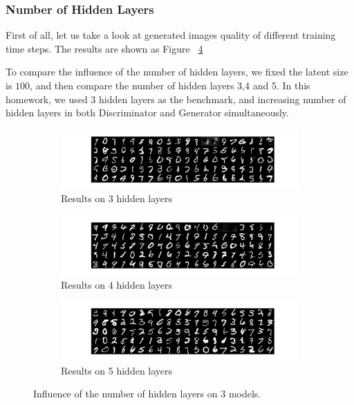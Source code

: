 \documentclass[12pt,letterpaper]{article}
\begin{document}
\subsubsection{Number of Hidden Layers}

First of all, let us take a look at generated images quality of different training time steps. The results are shown as Figure ~\ref{fig:MNIST_GAN_hidden}

To compare the influence of the number of hidden layers, we fixed the latent size is $100$, and then compare the number of hidden layers 3,4 and 5. In this homework, we used 3 hidden layers as the benchmark, and increasing number of hidden layers in both Discriminator and Generator simultaneously. 

\begin{figure}[h]
    \begin{subfigure}{0.49\textwidth}
    \includegraphics[width=\linewidth]{GAN_MNIST_0_100_256.png}
    \caption{\small Results on 3 hidden layers} \label{fig:a}
    \end{subfigure}\hspace*{\fill}
    \begin{subfigure}{0.49\textwidth}
    \includegraphics[width=\linewidth]{GAN_MNIST_1_100_256.png}
    \caption{\small Results on 4 hidden layers} \label{fig:b}
    \end{subfigure}

    \medskip
    \begin{subfigure}{0.49\textwidth}
    \includegraphics[width=\linewidth]{GAN_MNIST_2_100_256.png}
    \caption{\small Results on 5 hidden layers} \label{fig:c}
    \end{subfigure}\hspace*{\fill}
    \caption{Influence of the number of hidden layers on $3$ models.} \label{fig:MNIST_GAN_hidden}
\end{figure}
\end{document}
